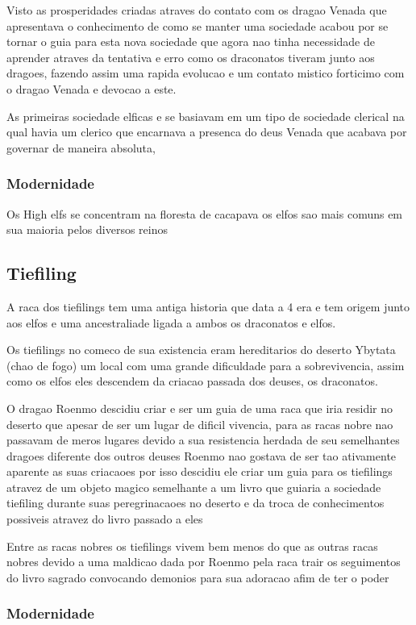\documentclass{book}
\begin{document}
Visto as prosperidades criadas atraves do contato com os dragao Venada que apresentava o 
conhecimento de como se manter uma sociedade acabou por se tornar o guia para esta nova
sociedade que agora nao tinha necessidade de aprender atraves da tentativa e erro como os 
draconatos tiveram junto aos dragoes, fazendo assim uma rapida evolucao e um contato mistico 
forticimo com o dragao Venada e devocao a este.

As primeiras sociedade elficas e se basiavam em um tipo de sociedade clerical na qual havia um 
clerico que encarnava a presenca do deus Venada que acabava por governar de maneira absoluta,

\subsubsection*{Modernidade}
Os High elfs se concentram na floresta de cacapava os elfos sao mais comuns em sua maioria pelos 
diversos reinos 

\subsection{Tiefiling}
A raca dos tiefilings tem uma antiga historia que data a 4 era e tem origem junto aos elfos e 
uma ancestraliade ligada a ambos os draconatos e elfos.

Os tiefilings no comeco de sua existencia eram hereditarios do deserto Ybytata (chao de fogo) 
um local com uma grande dificuldade para a sobrevivencia, assim como os elfos eles descendem 
da criacao passada dos deuses, os draconatos.

O dragao Roenmo descidiu criar e ser um guia de uma raca que iria residir no deserto que apesar 
de ser um lugar de dificil vivencia, para as racas nobre nao passavam de meros lugares devido 
a sua resistencia herdada de seu semelhantes dragoes diferente dos outros deuses Roenmo nao 
gostava de ser tao ativamente aparente as suas criacaoes por isso descidiu ele criar um guia 
para os tiefilings atravez de um objeto magico semelhante a um livro que guiaria a sociedade 
tiefiling durante suas peregrinacaoes no deserto e da troca de conhecimentos possiveis atravez
do livro passado a eles

Entre as racas nobres os tiefilings vivem bem menos do que as outras racas nobres devido a uma 
maldicao dada por Roenmo pela raca trair os seguimentos do livro sagrado convocando demonios 
para sua adoracao afim de ter o poder 

\subsubsection*{Modernidade}
\end{document}
